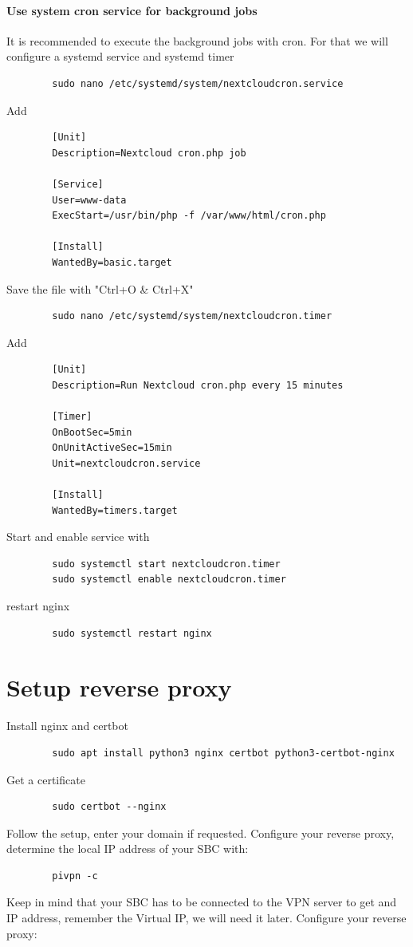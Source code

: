 \documentclass[a4paper,12pt]{article}
\begin{document}
	\paragraph{Use system cron service for background jobs}
	It is recommended to execute the background jobs with cron. For that we will configure a systemd service and systemd timer
	\begin{verbatim}
		sudo nano /etc/systemd/system/nextcloudcron.service
	\end{verbatim}
	Add
	\begin{verbatim}
		[Unit]
		Description=Nextcloud cron.php job
		
		[Service]
		User=www-data
		ExecStart=/usr/bin/php -f /var/www/html/cron.php
		
		[Install]
		WantedBy=basic.target
	\end{verbatim}
	Save the file with "Ctrl+O \& Ctrl+X"
	\begin{verbatim}
		sudo nano /etc/systemd/system/nextcloudcron.timer
	\end{verbatim}
	Add 
	\begin{verbatim}
		[Unit]
		Description=Run Nextcloud cron.php every 15 minutes
		
		[Timer]
		OnBootSec=5min
		OnUnitActiveSec=15min
		Unit=nextcloudcron.service
		
		[Install]
		WantedBy=timers.target
	\end{verbatim}
	Start and enable service with
	\begin{verbatim}
		sudo systemctl start nextcloudcron.timer
		sudo systemctl enable nextcloudcron.timer
	\end{verbatim}
		
	restart nginx
	\begin{verbatim}
		sudo systemctl restart nginx
	\end{verbatim}
	\section{Setup reverse proxy}
	Install nginx and certbot
	\begin{verbatim}
		sudo apt install python3 nginx certbot python3-certbot-nginx
	\end{verbatim}
	Get a certificate
	\begin{verbatim}
		sudo certbot --nginx
	\end{verbatim}
	Follow the setup, enter your domain if requested. \newline
	Configure your reverse proxy, determine the local IP address of your SBC with:
	\begin{verbatim}
		pivpn -c
	\end{verbatim}
	Keep in mind that your SBC has to be connected to the VPN server to get and IP address, remember the Virtual IP, we will need it later.\newline
	Configure your reverse proxy:
	
\end{document}
